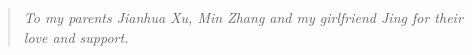 
\thispagestyle{plain}
	\begin{quote}
	\begin{center}
	\begin{spacing}{2.5}
        \em{ To my parents Jianhua Xu, Min Zhang and my girlfriend Jing for their love and support. }
        \end{spacing}
        \end{center}
   	\end{quote}


